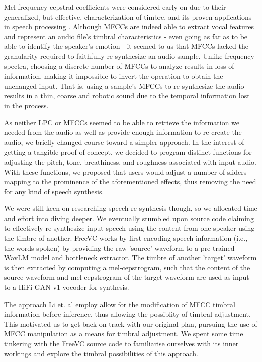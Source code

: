 \documentclass{article}
\begin{document}
Mel-frequency cepstral coefficients were considered early on due to their generalized, but effective, characterization of timbre, and its proven applications in speech processing \cite{Ittichaichareon12}. Although MFCCs are indeed able to extract vocal features and represent an audio file's timbral characteristics - even going as far as to be able to identify the speaker's emotion \cite{Lalithaa15} - it seemed to us that MFCCs lacked the granularity required to faithfully re-synthesize an audio sample. Unlike frequency spectra, choosing a discrete number of MFCCs to analyze results in loss of information, making it impossible to invert the operation to obtain the unchanged input. That is, using a sample's MFCCs to re-synthesize the audio results in a thin, coarse and robotic sound due to the temporal information lost in the process.

As neither LPC or MFCCs seemed to be able to retrieve the information we needed from the audio as well as provide enough information to re-create the audio, we briefly changed course toward a simpler approach. In the interest of getting a tangible proof of concept, we decided to program distinct functions for adjusting the pitch, tone, breathiness, and roughness associated with input audio. With these functions, we proposed that users would adjust a number of sliders mapping to the prominence of the aforementioned effects, thus removing the need for any kind of speech synthesis.

We were still keen on researching speech re-synthesis though, so we allocated time and effort into diving deeper. We eventually stumbled upon source code claiming to effectively re-synthesize input speech using the content from one speaker using the timbre of another. FreeVC \cite{Li22} works by first encoding speech information (i.e., the words spoken) by providing the raw 'source' waveform to a pre-trained WavLM model and bottleneck extractor. The timbre of another 'target' waveform is then extracted by computing a mel-cepstrogram, such that the content of the source waveform and mel-cepstrogram of the target waveform are used as input to a HiFi-GAN v1 vocoder \cite{Kong20} for synthesis.

The approach Li et. al \cite{Li22} employ allow for the modification of MFCC timbral information before inference, thus allowing the possiblity of timbral adjustment. This motivated us to get back on track with our original plan, pursuing the use of MFCC manipulation as a means for timbral adjustment. We spent some time tinkering with the FreeVC source code to familiarise ourselves with its inner workings and explore the timbral possibilities of this approach.
\end{document}
